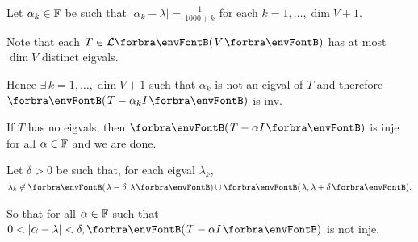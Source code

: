 \documentclass[a4paper, 11pt, UTF8]{article}
\begin{document}
\begin{large}
\par\quad
Let $\alpha_k\in{\mathbb{F}}$ be such that $\left|\alpha_k-\lambda\right|=\displaystyle\frac{1}{1000+k}$ for each $k=1,\dots,\dim V+1.$\par\vspace{6pt}\quad
Note that each $T\in\Lm{V}$ has at most $\dim V$ distinct eigvals.\par\quad
Hence $\exists\,k=1,\dots,\dim V+1$ such that $\alpha_k$ is not an eigval of $T$ and therefore $\Par{T-\alpha_k I}$ is inv.\PfEnd
\SepLine

\par\quad
If $T$ has no eigvals, then $\Par{T-\alpha I}$ is inje for all $\alpha\in{\mathbb{F}}$ and we are done.\par\quad
Let $\delta>0$ be such that, for each eigval $\lambda_k,$ $\lambda_k\not\in\Par{\lambda-\delta,\lambda}\cup \Par{\lambda,\lambda+\delta}.$\par\quad
So that for all $\alpha\in{\mathbb{F}}$ such that $0<\left|\alpha-\lambda\right|<\delta,\Par{T-\alpha I}$ is not inje.\PfEnd
\SepLine


\end{large}
\end{document}
